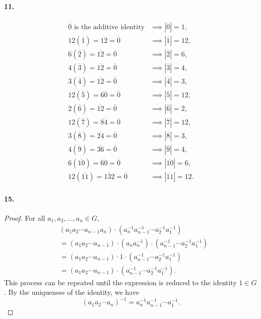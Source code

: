 \documentclass{article}
\begin{document}
\paragraph{11.}
\begin{align*}
  \overline{0}\text{ is the additive identity}
  &\implies |\overline{0}| = 1, \\
  12(\overline{1}) = \overline{12} = \overline{0}
  &\implies |\overline{1}| = 12, \\
  6(\overline{2}) = \overline{12} = \overline{0}
  &\implies |\overline{2}| = 6, \\
  4(\overline{3}) = \overline{12} = \overline{0}
  &\implies |\overline{3}| = 4, \\
  3(\overline{4}) = \overline{12} = \overline{0}
  &\implies |\overline{4}| = 3, \\
  12(\overline{5}) = \overline{60} = \overline{0}
  &\implies |\overline{5}| = 12, \\
  2(\overline{6}) = \overline{12} = \overline{0}
  &\implies |\overline{6}| = 2, \\
  12(\overline{7}) = \overline{84} = \overline{0}
  &\implies |\overline{7}| = 12, \\
  3(\overline{8}) = \overline{24} = \overline{0}
  &\implies |\overline{8}| = 3, \\
  4(\overline{9}) = \overline{36} = \overline{0}
  &\implies |\overline{9}| = 4, \\
  6(\overline{10}) = \overline{60} = \overline{0}
  &\implies |\overline{10}| = 6, \\
  12(\overline{11}) = \overline{132} = \overline{0}
  &\implies |\overline{11}| = 12.
\end{align*}

\paragraph{15.}
\begin{proof}
  For all $a_1, a_2, \ldots, a_n \in G$, \begin{align*}
    &(a_1a_2 \cdots a_{n-1}a_n) \cdot (a_n^{-1}a_{n-1}^{-1} \cdots
    a_2^{-1}a_1^{-1}) \\
    &= (a_1a_2 \cdots a_{n-1}) \cdot (a_n a_n^{-1}) \cdot
    (a_{n-1}^{-1} \cdots a_2^{-1}a_1^{-1}) \\
    &= (a_1a_2 \cdots a_{n-1}) \cdot 1 \cdot
    (a_{n-1}^{-1} \cdots a_2^{-1}a_1^{-1}) \\
    &= (a_1a_2 \cdots a_{n-1}) \cdot (a_{n-1}^{-1} \cdots a_2^{-1}a_1^{-1}).
  \end{align*}
  This process can be repeated until the expression is reduced to the identity
  $1 \in G$. By the uniqueness of the identity, we have \[
    (a_1a_2 \cdots a_n)^{-1} = a_n^{-1}a_{n-1}^{-1} \cdots a_1^{-1}.
  \]
\end{proof}
\end{document}
